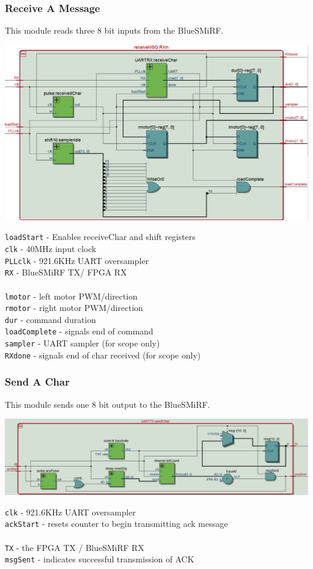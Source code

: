 \documentclass[12pt]{article}
\begin{document}
\subsubsection{Receive A Message}
This module reads three 8 bit inputs from the BlueSMiRF.
\begin{center}
\includegraphics[width=\textwidth]{rxin}
\end{center}
\verb.loadStart. - Enables receiveChar and shift registers
\\ \verb.clk. - 40MHz input clock
\\ \verb.PLLclk. - 921.6KHz UART oversampler
\\ \verb.RX. - BlueSMiRF TX/ FPGA RX
\\\\ \verb.lmotor. - left motor PWM/direction
\\ \verb.rmotor. - right motor PWM/direction
\\ \verb.dur. - command duration
\\ \verb.loadComplete. - signals end of command
\\ \verb.sampler. - UART sampler (for scope only)
\\ \verb.RXdone. - signals end of char received (for scope only)


\subsubsection{Send A Char}
This module sends one 8 bit output to the BlueSMiRF.
\begin{center}
\includegraphics[width=\textwidth]{sendChar}
\end{center}
\verb.clk. - 921.6KHz UART oversampler
\\ \verb.ackStart. - resets counter to begin transmitting ack message
\\\\ \verb.TX. - the FPGA TX / BlueSMiRF RX
\\ \verb.msgSent. - indicates successful transmission of ACK
\end{document}
